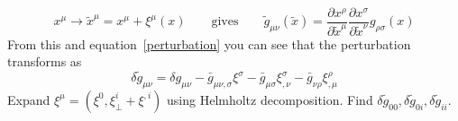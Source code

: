 \begin{equation}
    x^\mu \rightarrow \tilde{x}^{\mu} = x^{\mu} + \xi^{\mu}(x) \qquad \text{gives} \qquad \tilde{g}_{\mu\nu}(\tilde{x}) = \frac{\partial x^\rho}{\partial\tilde{x}^\mu}\frac{\partial x^\sigma}{\partial\tilde{x}^\nu}g_{\rho\sigma}(x)
\end{equation}
From this and equation~\eqref{perturbation} you can see that the perturbation transforms as
\begin{equation}
    \delta \tilde{g}_{\mu\nu} = \delta g_{\mu\nu} - \bar{g}_{\mu\nu,\sigma} \xi^\sigma - \bar{g}_{\mu\sigma} \xi^\sigma_{,\nu} - \bar{g}_{\nu\rho} \xi^\rho_{,\mu} 
\end{equation}
Expand $\xi^\mu = \left(\xi^0,\xi^i_\perp+\xi^{,i}\right)$ using Helmholtz decomposition. Find $\delta \tilde{g}_{00}, \delta \tilde{g}_{0i}, \delta \tilde{g}_{ii} $.   


%
%    
